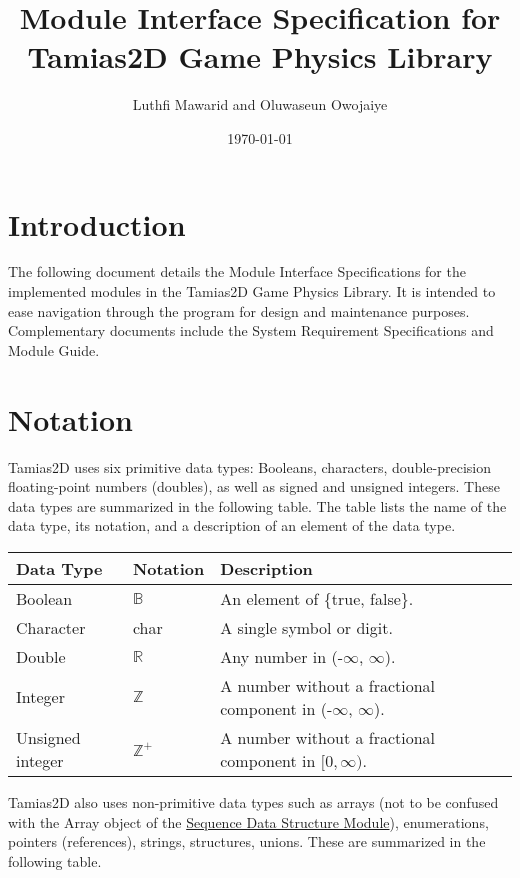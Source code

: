 \documentclass[12pt]{article}
\newcommand{\progname}{Tamias2D }
\newcommand{\Sequence}{\hyperref[MISSequence]{Sequence Data Structure Module}}
\begin{document}
\title{Module Interface Specification for \progname Game Physics Library} \author{Luthfi Mawarid and Oluwaseun Owojaiye}
\date{\today}

\maketitle

\tableofcontents

\section{Introduction} \label{SecIntro}

The following document details the Module Interface
Specifications for the implemented modules in the \progname Game Physics Library. It is intended to ease navigation through the program for design and
maintenance purposes. Complementary documents include the System
Requirement Specifications and Module Guide.

\section{Notation} \label{SecNotation}

\progname uses six primitive data types: Booleans, characters, double-precision floating-point numbers (doubles), as well as signed and unsigned integers. These data types are summarized in the following table. The table lists the name of the 
data type, its notation, and a description of an element of the data type. 

\renewcommand*{\arraystretch}{1.2}
\noindent  \begin{longtable}{l l p{10.5cm}} 
\toprule 
\textbf{Data Type} & \textbf{Notation} & \textbf{Description} \\ 
\midrule
Boolean & $\mathbb{B}$ & An element of \{true, false\}. \\
Character & char & A single symbol or digit. \\
Double & $\mathbb{R}$ & Any number in (-$\infty$, $\infty$). \\
Integer & $\mathbb{Z}$ & A number without a fractional
  component in (-$\infty$, $\infty$). \\
Unsigned integer & $\mathbb{Z}^+$ & A number without a fractional
  component in $[0, \infty)$. \\
\bottomrule
\end{longtable} 

\noindent \progname also uses non-primitive data types such as arrays (not to be confused with the Array object of the \Sequence), enumerations, pointers (references), strings, structures, unions. These are summarized in the following table.
\end{document}
